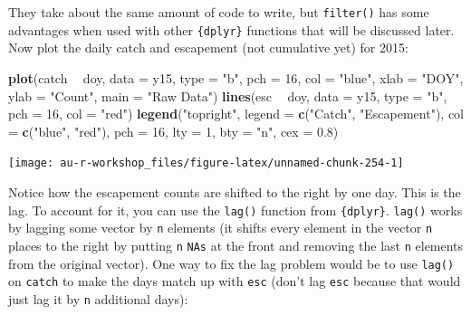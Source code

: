 \documentclass[]{book}
\newenvironment{Shaded}{\begin{snugshade}}{\end{snugshade}}
\newcommand{\KeywordTok}[1]{\textcolor[rgb]{0.13,0.29,0.53}{\textbf{#1}}}
\newcommand{\DataTypeTok}[1]{\textcolor[rgb]{0.13,0.29,0.53}{#1}}
\newcommand{\DecValTok}[1]{\textcolor[rgb]{0.00,0.00,0.81}{#1}}
\newcommand{\FloatTok}[1]{\textcolor[rgb]{0.00,0.00,0.81}{#1}}
\newcommand{\StringTok}[1]{\textcolor[rgb]{0.31,0.60,0.02}{#1}}
\newcommand{\OperatorTok}[1]{\textcolor[rgb]{0.81,0.36,0.00}{\textbf{#1}}}
\newcommand{\NormalTok}[1]{#1}
\theoremstyle{definition}
\theoremstyle{definition}
\theoremstyle{definition}
\theoremstyle{remark}
\begin{document}
They take about the same amount of code to write, but \texttt{filter()}
has some advantages when used with other \texttt{\{dplyr\}} functions
that will be discussed later. Now plot the daily catch and escapement
(not cumulative yet) for 2015:

\begin{Shaded}
\begin{Highlighting}[]
\KeywordTok{plot}\NormalTok{(catch }\OperatorTok{~}\StringTok{ }\NormalTok{doy, }\DataTypeTok{data =}\NormalTok{ y15, }\DataTypeTok{type =} \StringTok{"b"}\NormalTok{, }\DataTypeTok{pch =} \DecValTok{16}\NormalTok{, }\DataTypeTok{col =} \StringTok{"blue"}\NormalTok{,}
     \DataTypeTok{xlab =} \StringTok{"DOY"}\NormalTok{, }\DataTypeTok{ylab =} \StringTok{"Count"}\NormalTok{, }\DataTypeTok{main =} \StringTok{"Raw Data"}\NormalTok{)}
\KeywordTok{lines}\NormalTok{(esc }\OperatorTok{~}\StringTok{ }\NormalTok{doy, }\DataTypeTok{data =}\NormalTok{ y15, }\DataTypeTok{type =} \StringTok{"b"}\NormalTok{, }\DataTypeTok{pch =} \DecValTok{16}\NormalTok{, }\DataTypeTok{col =} \StringTok{"red"}\NormalTok{)}
\KeywordTok{legend}\NormalTok{(}\StringTok{"topright"}\NormalTok{, }\DataTypeTok{legend =} \KeywordTok{c}\NormalTok{(}\StringTok{"Catch"}\NormalTok{, }\StringTok{"Escapement"}\NormalTok{), }
       \DataTypeTok{col =} \KeywordTok{c}\NormalTok{(}\StringTok{"blue"}\NormalTok{, }\StringTok{"red"}\NormalTok{), }\DataTypeTok{pch =} \DecValTok{16}\NormalTok{, }\DataTypeTok{lty =} \DecValTok{1}\NormalTok{, }\DataTypeTok{bty =} \StringTok{"n"}\NormalTok{, }\DataTypeTok{cex =} \FloatTok{0.8}\NormalTok{)}
\end{Highlighting}
\end{Shaded}

\begin{center}\texttt{[image: au-r-workshop\_files/figure-latex/unnamed-chunk-254-1]} \end{center}

Notice how the escapement counts are shifted to the right by one day.
This is the lag. To account for it, you can use the \texttt{lag()}
function from \texttt{\{dplyr\}}. \texttt{lag()} works by lagging some
vector by \texttt{n} elements (it shifts every element in the vector
\texttt{n} places to the right by putting \texttt{n} \texttt{NAs} at the
front and removing the last \texttt{n} elements from the original
vector). One way to fix the lag problem would be to use \texttt{lag()}
on \texttt{catch} to make the days match up with \texttt{esc} (don't lag
\texttt{esc} because that would just lag it by \texttt{n} additional
days):
\end{document}
